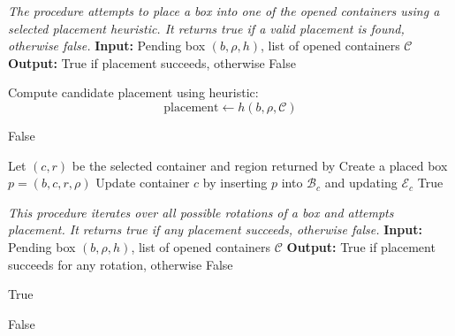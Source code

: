 \begin{algorithm}[htbp]
\centering
\begin{minipage}{0.95\linewidth}
\begin{algorithmic}[1]

\Statex \textit{The procedure attempts to place a box into one of the opened containers using a selected placement heuristic. It returns true if a valid placement is found, otherwise false.}
\State \textbf{Input:} Pending box $(b, \rho, h)$, list of opened containers $\mathcal{C}$
\State \textbf{Output:} True if placement succeeds, otherwise False

\State Compute candidate placement using heuristic:
\[
\text{placement} \leftarrow h(b, \rho, \mathcal{C})
\]

    \State \Return False
\EndIf

\State Let $(c, r)$ be the selected container and region returned by 
\State Create a placed box $p = (b, c, r, \rho)$
\State Update container $c$ by inserting $p$ into $\mathcal{B}_c$ and updating $\mathcal{E}_c$
\State \Return True

\end{algorithmic}
\end{minipage}
\caption{TryPackBox Algorithm Pseudocode}
\end{algorithm}




\begin{algorithm}[htbp]
\centering
\begin{minipage}{0.95\linewidth}
\begin{algorithmic}[1]

    
\Statex \textit{This procedure iterates over all possible rotations of a box and attempts placement. It returns true if any placement succeeds, otherwise false.}
\State \textbf{Input:} Pending box $(b, \rho, h)$, list of opened containers $\mathcal{C}$
\State \textbf{Output:} True if placement succeeds for any rotation, otherwise False


        \State \Return True
    \EndIf

\EndFor

\State \Return False

\end{algorithmic}
\end{minipage}
\caption{TryPackWithAnyRotation Algorithm Pseudocode}
\end{algorithm}




